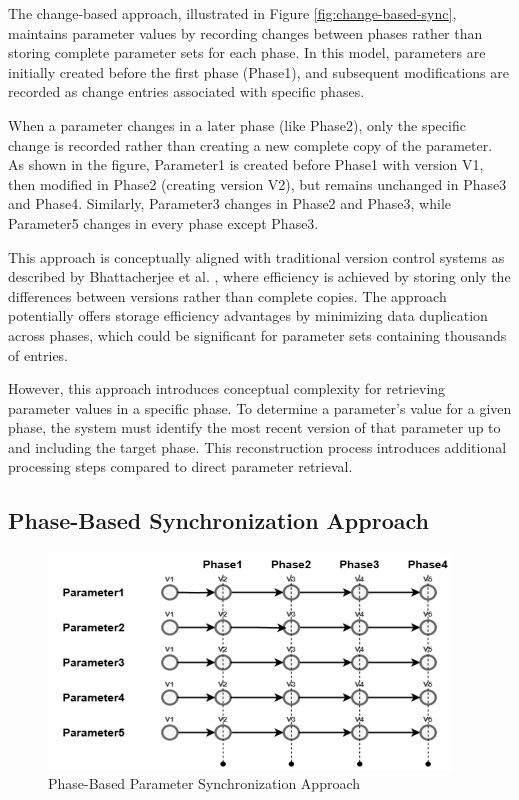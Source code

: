 The change-based approach, illustrated in Figure \ref{fig:change-based-sync}, maintains parameter values by recording changes between phases rather than storing complete parameter sets for each phase. In this model, parameters are initially created before the first phase (Phase1), and subsequent modifications are recorded as change entries associated with specific phases.

When a parameter changes in a later phase (like Phase2), only the specific change is recorded rather than creating a new complete copy of the parameter. As shown in the figure, Parameter1 is created before Phase1 with version V1, then modified in Phase2 (creating version V2), but remains unchanged in Phase3 and Phase4. Similarly, Parameter3 changes in Phase2 and Phase3, while Parameter5 changes in every phase except Phase3.

This approach is conceptually aligned with traditional version control systems as described by Bhattacherjee et al. \cite{bhattacherjee2015principles}, where efficiency is achieved by storing only the differences between versions rather than complete copies. The approach potentially offers storage efficiency advantages by minimizing data duplication across phases, which could be significant for parameter sets containing thousands of entries.

However, this approach introduces conceptual complexity for retrieving parameter values in a specific phase. To determine a parameter's value for a given phase, the system must identify the most recent version of that parameter up to and including the target phase. This reconstruction process introduces additional processing steps compared to direct parameter retrieval.

\subsection{Phase-Based Synchronization Approach}
\label{subsec:phase-based-sync}

\begin{figure}[h]
    \centering
    \includegraphics[width=0.95\textwidth]{figures/phase_based_approach.png}
    \caption{Phase-Based Parameter Synchronization Approach}
    \label{fig:phase-based-sync}
\end{figure}

